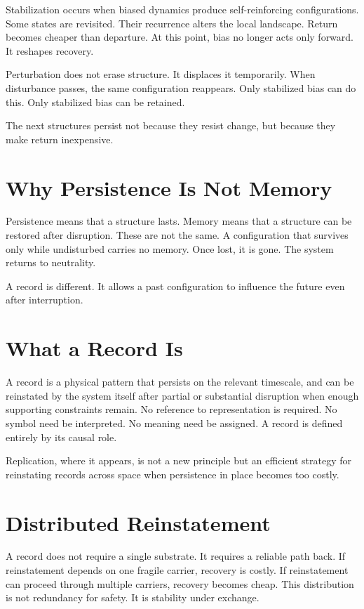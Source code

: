 \documentclass[11pt,twoside,openright]{book}
\begin{document}
Stabilization occurs when biased dynamics produce self-reinforcing configurations. Some states are revisited. Their recurrence alters the local landscape. Return becomes cheaper than departure. At this point, bias no longer acts only forward. It reshapes recovery.

Perturbation does not erase structure. It displaces it temporarily. When disturbance passes, the same configuration reappears. Only stabilized bias can do this. Only stabilized bias can be retained.

The next structures persist not because they resist change, but because they make return inexpensive.

\section*{Why Persistence Is Not Memory}

Persistence means that a structure lasts. Memory means that a structure can be restored after disruption. These are not the same. A configuration that survives only while undisturbed carries no memory. Once lost, it is gone. The system returns to neutrality.

A record is different. It allows a past configuration to influence the future even after interruption.

\section*{What a Record Is}

A record is a physical pattern that persists on the relevant timescale, and can be reinstated by the system itself after partial or substantial disruption when enough supporting constraints remain. No reference to representation is required. No symbol need be interpreted. No meaning need be assigned. A record is defined entirely by its causal role.

Replication, where it appears, is not a new principle but an efficient strategy for reinstating records across space when persistence in place becomes too costly.

\section*{Distributed Reinstatement}

A record does not require a single substrate. It requires a reliable path back. If reinstatement depends on one fragile carrier, recovery is costly. If reinstatement can proceed through multiple carriers, recovery becomes cheap. This distribution is not redundancy for safety. It is stability under exchange.
\end{document}
